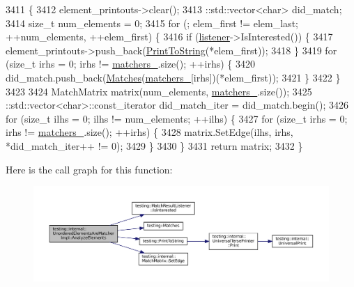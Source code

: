 \begin{DoxyCode}
3411                                                                    \{
3412     element\_printouts->clear();
3413     ::std::vector<char> did\_match;
3414     \textcolor{keywordtype}{size\_t} num\_elements = 0;
3415     \textcolor{keywordflow}{for} (; elem\_first != elem\_last; ++num\_elements, ++elem\_first) \{
3416       \textcolor{keywordflow}{if} (\hyperlink{namespaceinteractive__marker_a0e579ab555212bb5e2c9f8a675b7618a}{listener}->IsInterested()) \{
3417         element\_printouts->push\_back(\hyperlink{namespacetesting_aa5717bb1144edd1d262d310ba70c82ed}{PrintToString}(*elem\_first));
3418       \}
3419       \textcolor{keywordflow}{for} (\textcolor{keywordtype}{size\_t} irhs = 0; irhs != \hyperlink{classtesting_1_1internal_1_1UnorderedElementsAreMatcherImpl_a8f369b32578badf837a76ee66b033c81}{matchers\_}.size(); ++irhs) \{
3420         did\_match.push\_back(\hyperlink{namespacetesting_ad53b509ae9cd51040d67f668f99702ae}{Matches}(\hyperlink{classtesting_1_1internal_1_1UnorderedElementsAreMatcherImpl_a8f369b32578badf837a76ee66b033c81}{matchers\_}[irhs])(*elem\_first));
3421       \}
3422     \}
3423 
3424     MatchMatrix matrix(num\_elements, \hyperlink{classtesting_1_1internal_1_1UnorderedElementsAreMatcherImpl_a8f369b32578badf837a76ee66b033c81}{matchers\_}.size());
3425     ::std::vector<char>::const\_iterator did\_match\_iter = did\_match.begin();
3426     \textcolor{keywordflow}{for} (\textcolor{keywordtype}{size\_t} ilhs = 0; ilhs != num\_elements; ++ilhs) \{
3427       \textcolor{keywordflow}{for} (\textcolor{keywordtype}{size\_t} irhs = 0; irhs != \hyperlink{classtesting_1_1internal_1_1UnorderedElementsAreMatcherImpl_a8f369b32578badf837a76ee66b033c81}{matchers\_}.size(); ++irhs) \{
3428         matrix.SetEdge(ilhs, irhs, *did\_match\_iter++ != 0);
3429       \}
3430     \}
3431     \textcolor{keywordflow}{return} matrix;
3432   \}
\end{DoxyCode}
Here is the call graph for this function\+:
\nopagebreak
\begin{figure}[H]
\begin{center}
\leavevmode
\includegraphics[width=350pt]{classtesting_1_1internal_1_1UnorderedElementsAreMatcherImpl_a327b473a760be4b4e0b3495b4e15a7e8_cgraph}
\end{center}
\end{figure}

